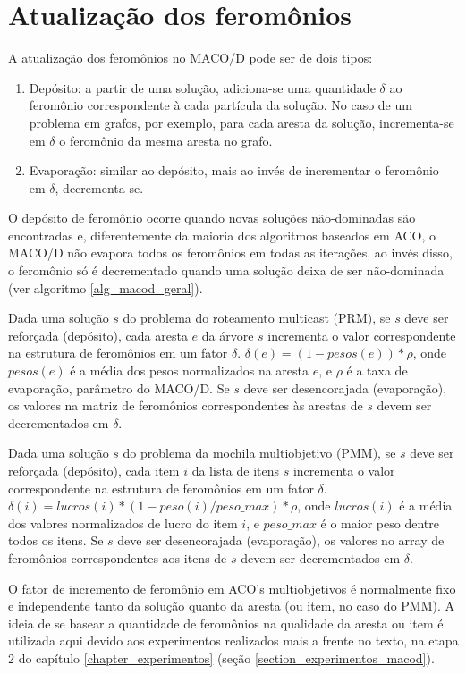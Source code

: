 \section{Atualização dos feromônios}

A atualização dos feromônios no MACO/D pode ser de dois tipos:

\begin{enumerate}
	\item Depósito: a partir de uma solução, adiciona-se uma quantidade $\delta$ ao feromônio correspondente à cada partícula da solução. No caso de um problema em grafos, por exemplo, para cada aresta da solução, incrementa-se em $\delta$ o feromônio da mesma aresta no grafo.
	\item Evaporação: similar ao depósito, mais ao invés de incrementar o feromônio em $\delta$, decrementa-se.
\end{enumerate}

O depósito de feromônio ocorre quando novas soluções não-dominadas são encontradas e, diferentemente da maioria dos algoritmos baseados em ACO, o MACO/D não evapora todos os feromônios em todas as iterações, ao invés disso, o feromônio só é decrementado quando uma solução deixa de ser não-dominada (ver algoritmo \ref{alg_macod_geral}).

Dada uma solução $s$ do problema do roteamento multicast (PRM), se $s$ deve ser reforçada (depósito), cada aresta $e$ da árvore $s$ incrementa o valor correspondente na estrutura de feromônios em um fator $\delta$. $\delta(e) = (1 - pesos(e)) * \rho$, onde $pesos(e)$ é a média dos pesos normalizados na aresta $e$, e $\rho$ é a taxa de evaporação, parâmetro do MACO/D. Se $s$ deve ser desencorajada (evaporação), os valores na matriz de feromônios correspondentes às arestas de $s$ devem ser decrementados em $\delta$.

Dada uma solução $s$ do problema da mochila multiobjetivo (PMM), se $s$ deve ser reforçada (depósito), cada item $i$ da lista de itens $s$ incrementa o valor correspondente na estrutura de feromônios em um fator $\delta$. $\delta(i) = lucros(i) * (1 - peso(i) / peso\_{max}) * \rho$, onde $lucros(i)$ é a média dos valores normalizados de lucro do item $i$, e $peso\_{max}$ é o maior peso dentre todos os itens. Se $s$ deve ser desencorajada (evaporação), os valores no array de feromônios correspondentes aos itens de $s$ devem ser decrementados em $\delta$.

O fator de incremento de feromônio em ACO's multiobjetivos é normalmente fixo e independente tanto da solução quanto da aresta (ou item, no caso do PMM). A ideia de se basear a quantidade de feromônios na qualidade da aresta ou item é utilizada aqui devido aos experimentos realizados mais a frente no texto, na etapa 2 do capítulo \ref{chapter_experimentos} (seção \ref{section_experimentos_macod}).